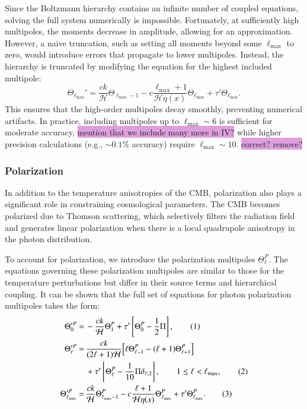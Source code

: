 \documentclass{aa}
\newcommand\numberthis{\addtocounter{equation}{1}\tag{\theequation}}
\numberwithin{equation}{section}
\numberwithin{table}{section}
\numberwithin{figure}{section}
\begin{document}
Since the Boltzmann hierarchy contains an infinite number of coupled equations, solving the full system numerically is impossible. Fortunately, at sufficiently high multipoles, the moments decrease in amplitude, allowing for an approximation. However, a naive truncation, such as setting all moments beyond some $\ell_{\max}$ to zero, would introduce errors that propagate to lower multipoles. Instead, the hierarchy is truncated by modifying the equation for the highest included multipole:
\begin{equation} 
  \Theta_{\ell_{\max}}' = \frac{ck}{\mathcal{H}} \Theta_{\ell_{\max}-1} - c \frac{\ell_{\max}+1}{\mathcal{H} \eta(x)} \Theta_{\ell_{\max}} + \tau' \Theta_{\ell_{\max}}. 
\end{equation}
This ensures that the high-order multipoles decay smoothly, preventing numerical artifacts. In practice, including multipoles up to $\ell_{\max} \sim 6$ is sufficient for moderate accuracy, \colorbox{Plum}{mention that we include many more in IV?} while higher precision calculations (e.g., $\sim 0.1\%$ accuracy) require $\ell_{\max} \sim 10$. \colorbox{Plum}{correct? remove?}


\subsubsection{Polarization}
In addition to the temperature anisotropies of the CMB, polarization also plays a significant role in constraining cosmological parameters. The CMB becomes polarized due to Thomson scattering, which selectively filters the radiation field and generates linear polarization when there is a local quadrupole anisotropy in the photon distribution.

To account for polarization, we introduce the polarization multipoles $\Theta^P_\ell$. The equations governing these polarization multipoles are similar to those for the temperature perturbations but differ in their source terms and hierarchical coupling. It can be shown that the full set of equations for photon polarization multipoles takes the form: 
\begin{align*} 
  \Theta'^P_0 =\, &-\frac{ck}{\mathcal{H}} \Theta^P_1 + \tau' \left[ \Theta^P_{0} - \frac{1}{2} \Pi \right], \numberthis \\ 
  \Theta'^P_{\ell} =\, &\frac{ck}{(2\ell+1)\mathcal{H}} \Big[\ell\Theta^P_{\ell-1} - (\ell+1)\Theta^P_{\ell+1}\Big] \\
  &+ \tau' \left[ \Theta^P_{\ell} - \frac{1}{10} \Pi \delta_{\ell,2} \right], \qquad 1 \leq \ell < \ell_{\max}, \numberthis \\ 
  \Theta'^P_{\ell_{\max}} =\, &\frac{ck}{\mathcal{H}} \Theta^P_{\ell_{\max}-1} - c \frac{\ell+1}{\mathcal{H}\eta(x)} \Theta^P_{\ell_{\max}} + \tau' \Theta^P_{\ell_{\max}}. \numberthis
\end{align*}
\end{document}

